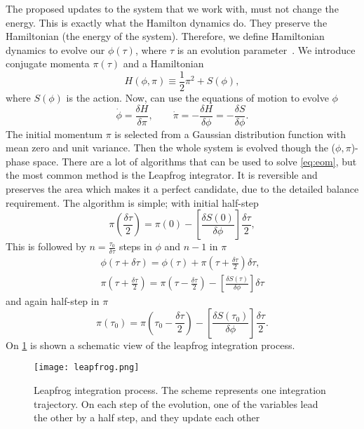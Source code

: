 The proposed updates to the system that we work with, must not change the energy. This is exactly what the Hamilton dynamics do. They preserve the Hamiltonian (the energy of the system). Therefore, we define Hamiltonian dynamics to evolve our $\phi(\tau)$, where $\tau$ is an evolution parameter~\cite{hmc}. We introduce conjugate momenta $\pi(\tau)$ and a Hamiltonian 
\begin{equation}
    H(\phi,\pi) \equiv \frac{1}{2}\pi^2 + S(\phi),
\end{equation}
where $S(\phi)$ is the action. Now, can use the equations of motion to evolve $\phi$
\begin{equation}
    \dot{\phi} = \frac{\delta H}{\delta \pi}, \qquad \dot{\pi} = - \frac{\delta H}{\delta \phi} = - \frac{\delta S}{\delta \phi}.
    \label{eq:eom}
\end{equation}
The initial momentum $\pi$ is selected from a Gaussian distribution function with mean zero and unit variance. Then the whole system is evolved though the ($\phi,\pi$)-phase space. There are a lot of algorithms that can be used to solve \cref{eq:eom}, but the most common method is the Leapfrog integrator. It is reversible and preserves the area which makes it a perfect candidate, due to the detailed balance requirement. The algorithm is simple; with initial half-step
\begin{equation}
    \pi\left(\frac{\delta\tau}{2}\right) = \pi\left(0\right) - \left[ \frac{\delta S(0)}{\delta\phi} \right] \frac{\delta\tau}{2},
\end{equation}
This is followed by $n=\frac{\tau_0}{\delta\tau}$ steps in $\phi$ and $n-1$ in $\pi$
\begin{equation}
    \begin{aligned}
        \phi(\tau+\delta\tau) = \phi(\tau) + \pi(\tau+\frac{\delta\tau}{2})\delta\tau,
        \\
        \pi(\tau+\frac{\delta\tau}{2}) = \pi(\tau-\frac{\delta\tau}{2}) - \left[ \frac{\delta S(\tau)}{\delta\phi} \right] \delta\tau
    \end{aligned}
\end{equation}
and again half-step in $\pi$
\begin{equation}
    \pi(\tau_0) = \pi(\tau_0-\frac{\delta\tau}{2}) - \left[ \frac{\delta S(\tau_0)}{\delta\phi} \right] \frac{\delta\tau}{2}.
\end{equation}
On \cref{fig:leapfrog} is shown a schematic view of the leapfrog integration process.
\begin{figure}[htbp]
    \centerline{\texttt{[image: leapfrog.png]}}
    \caption{Leapfrog integration process. The scheme represents one integration trajectory. On each step of the evolution, one of the variables lead the other by a half step, and they update each other~\cite{pic-leapfrog}
    }
    \label{fig:leapfrog}
\end{figure}


